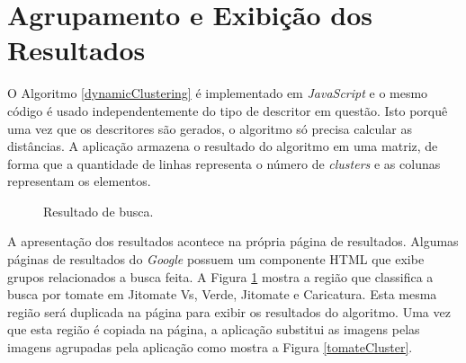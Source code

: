 \section{Agrupamento e Exibição dos Resultados}
O Algoritmo \ref{dynamicClustering} é implementado em \emph{JavaScript} e o mesmo código é usado independentemente do tipo de descritor em questão. Isto porquê uma vez que os descritores são gerados, o algoritmo só precisa calcular as distâncias. A aplicação armazena o resultado do algoritmo em uma matriz, de forma que a quantidade de linhas representa o número de \emph{clusters} e as colunas representam os elementos.

\begin{figure}[htb]
\begin{center}
  \centering
  \caption{Resultado de busca.}
    
    \label{resultadoBusca}
  
\end{center}

\end{figure}

A apresentação dos resultados acontece na própria página de resultados. Algumas páginas de resultados do \emph{Google} possuem um componente HTML que exibe grupos relacionados a busca feita. A Figura \ref{resultadoBusca} mostra a região que classifica a busca por tomate em Jitomate Vs, Verde, Jitomate e Caricatura. Esta mesma região será duplicada na página para exibir os resultados do algoritmo. Uma vez que esta região é copiada na página, a aplicação substitui as imagens pelas imagens agrupadas pela aplicação como mostra a Figura \ref{tomateCluster}.

